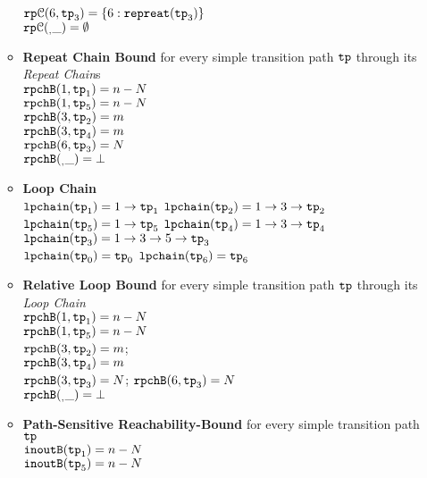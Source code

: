 \begin{enumerate}
\begin{itemize}
    $\mathtt{rp}\mathcal{C}(6, \mathtt{tp}_3) = \{6: \mathtt{repreat}(\mathtt{tp}_3)\}$
    \\
    $\mathtt{rp}\mathcal{C}(_, \_) = \emptyset$ 
    \item \textbf{Repeat Chain Bound} for every simple transition path $\mathtt{tp}$ through its \emph{Repeat Chain}s
    \\
    $\mathtt{rpchB}(1, \mathtt{tp}_1) = n - N$ \\
    $\mathtt{rpchB}(1, \mathtt{tp}_5) = n - N$ \\
    $\mathtt{rpchB}(3, \mathtt{tp}_2) = m$ \\
    $\mathtt{rpchB}(3, \mathtt{tp}_4) = m$ \\
    $\mathtt{rpchB}(6, \mathtt{tp}_3) = N$ \\
    $\mathtt{rpchB}(_, \_) = \bot $ 
    \item \textbf{Loop Chain}
    \\
    $\mathtt{lpchain}(\mathtt{tp}_1) = 1\to \mathtt{tp}_1$ \quad
    $\mathtt{lpchain}(\mathtt{tp}_2) = 1 \to 3 \to \mathtt{tp}_2$ \\
    $\mathtt{lpchain}(\mathtt{tp}_5) = 1\to \mathtt{tp}_5$ \quad
    $\mathtt{lpchain}(\mathtt{tp}_4) = 1 \to 3 \to \mathtt{tp}_4$ \\
    \highlight
    {$\mathtt{lpchain}(\mathtt{tp}_3) = 1 \to 3 \to 5 \to \mathtt{tp}_3$ }\\
    $\mathtt{lpchain}(\mathtt{tp}_0) = \mathtt{tp}_0$ \quad
    $\mathtt{lpchain}(\mathtt{tp}_6) = \mathtt{tp}_6$ 
      \item \textbf{{Relative Loop Bound}} for every simple transition path $\mathtt{tp}$ through its \emph{Loop Chain}
    \\
    $\mathtt{rpchB}(1, \mathtt{tp}_1) = n - N$ \\
    $\mathtt{rpchB}(1, \mathtt{tp}_5) = n - N$ \\
     \quad  $\mathtt{rpchB}(3, \mathtt{tp}_2) = m$; \\
     \quad $\mathtt{rpchB}(3, \mathtt{tp}_4) = m$ \\
     \quad $\mathtt{rpchB}(3, \mathtt{tp}_3) = N$; \quad $\mathtt{rpchB}(6, \mathtt{tp}_3) = N$ \\
    $\mathtt{rpchB}(_, \_) = \bot $ 
    \item \textbf{Path-Sensitive Reachability-Bound} for every simple transition path $\mathtt{tp}$
    \\
    $\mathtt{inoutB}(\mathtt{tp}_1) = n - N$ \\
    $\mathtt{inoutB}(\mathtt{tp}_5) = n - N$ \\

\end{itemize}
\end{enumerate}
